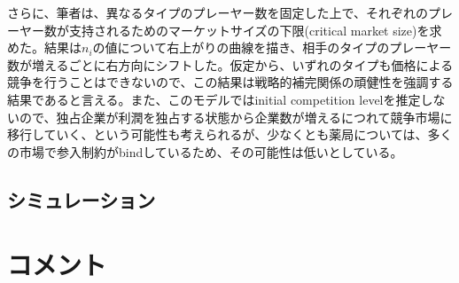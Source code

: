 \documentclass[11pt]{jsarticle}
\begin{document}
さらに、筆者は、異なるタイプのプレーヤー数を固定した上で、それぞれのプレーヤー数が支持されるためのマーケットサイズの下限(critical market size)を求めた。結果は$n_i$の値について右上がりの曲線を描き、相手のタイプのプレーヤー数が増えるごとに右方向にシフトした。仮定から、いずれのタイプも価格による競争を行うことはできないので、この結果は戦略的補完関係の頑健性を強調する結果であると言える。また、このモデルではinitial competition levelを推定しないので、独占企業が利潤を独占する状態から企業数が増えるにつれて競争市場に移行していく、という可能性も考えられるが、少なくとも薬局については、多くの市場で参入制約がbindしているため、その可能性は低いとしている。

\subsection{シミュレーション}

\section{コメント}
\end{document}

